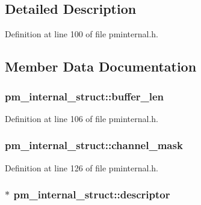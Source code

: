 \subsection{Detailed Description}


Definition at line 100 of file pminternal.\+h.



\subsection{Member Data Documentation}
\subsubsection[{\texorpdfstring{buffer\+\_\+len}{buffer_len}}]{ pm\+\_\+internal\+\_\+struct\+::buffer\+\_\+len}\hypertarget{structpm__internal__struct_a253ecc9475134223732c0b450e25c99e}{}\label{structpm__internal__struct_a253ecc9475134223732c0b450e25c99e}


Definition at line 106 of file pminternal.\+h.

\subsubsection[{\texorpdfstring{channel\+\_\+mask}{channel_mask}}]{ pm\+\_\+internal\+\_\+struct\+::channel\+\_\+mask}\hypertarget{structpm__internal__struct_af267d4b365e7c7578c6d967d76e5a93a}{}\label{structpm__internal__struct_af267d4b365e7c7578c6d967d76e5a93a}


Definition at line 126 of file pminternal.\+h.

\subsubsection[{\texorpdfstring{descriptor}{descriptor}}]{$\ast$ pm\+\_\+internal\+\_\+struct\+::descriptor}\hypertarget{structpm__internal__struct_ae973f4d675d47c1b858ab4d2fb51281f}{}\label{structpm__internal__struct_ae973f4d675d47c1b858ab4d2fb51281f}


